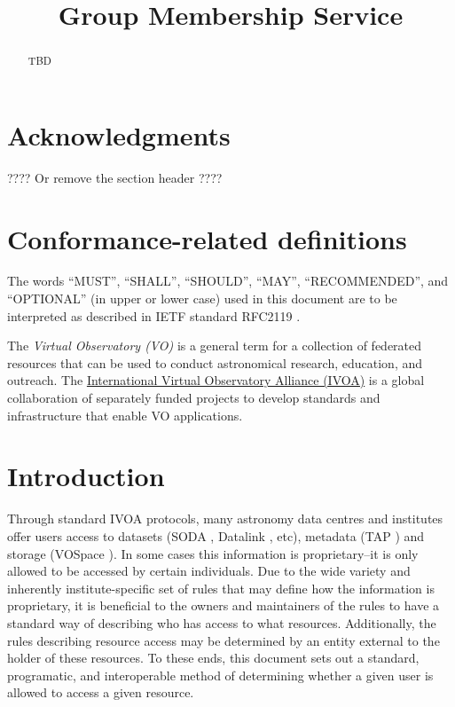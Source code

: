 \documentclass[11pt,a4paper]{ivoa}
\title{Group Membership Service}
\author{}
\author{}
\begin{document}
\begin{abstract}

TBD

\end{abstract}


\section*{Acknowledgments}

???? Or remove the section header ????

\section*{Conformance-related definitions}

The words ``MUST'', ``SHALL'', ``SHOULD'', ``MAY'', ``RECOMMENDED'', and
``OPTIONAL'' (in upper or lower case) used in this document are to be
interpreted as described in IETF standard RFC2119 \citep{std:RFC2119}.

The \emph{Virtual Observatory (VO)} is a
general term for a collection of federated resources that can be used
to conduct astronomical research, education, and outreach.
The \href{http://www.ivoa.net}{International
Virtual Observatory Alliance (IVOA)} is a global
collaboration of separately funded projects to develop standards and
infrastructure that enable VO applications.


\section{Introduction}

Through standard IVOA protocols, many astronomy data centres and institutes offer users access to datasets (SODA \citep{std:SODA}, Datalink \citep{std:Datalink}, etc), metadata (TAP \citep{std:TAP}) and storage (VOSpace \citep{std:VOSpace}).  In some cases this information is proprietary--it is only allowed to be accessed by certain individuals.  Due to the wide variety and inherently institute-specific set of rules that may define how the information is proprietary, it is beneficial to the owners and maintainers of the rules to have a standard way of describing who has access to what resources.  Additionally, the rules describing resource access may be determined by an entity external to the holder of these resources.  To these ends, this document sets out a standard, programatic, and interoperable method of determining whether a given user is allowed to access a given resource.
\end{document}
